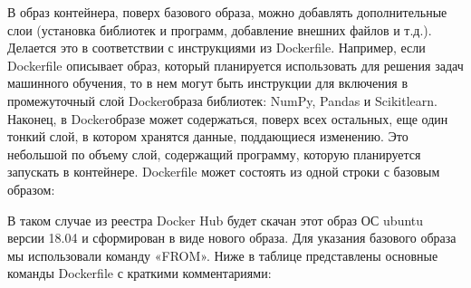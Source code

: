 \documentclass[letterpaper,10pt,russian]{sphinxmanual}
\begin{document}
\sphinxAtStartPar
В образ контейнера, поверх базового образа, можно добавлять дополнительные слои (установка библиотек и программ, добавление внешних файлов и т.д.). Делается это в соответствии с инструкциями из Dockerfile. Например, если Dockerfile описывает образ, который планируется использовать для решения задач машинного обучения, то в нем могут быть инструкции для включения в промежуточный слой Docker\sphinxhyphen{}образа библиотек: NumPy, Pandas и Scikit\sphinxhyphen{}learn. Наконец, в Docker\sphinxhyphen{}образе может содержаться, поверх всех остальных, еще один тонкий слой, в котором хранятся данные, поддающиеся изменению. Это небольшой по объему слой, содержащий программу, которую планируется запускать в контейнере. Dockerfile может состоять из одной строки с базовым образом:

\begin{sphinxVerbatim}[commandchars=\\\{\}]
\end{sphinxVerbatim}

\sphinxAtStartPar
В таком случае из реестра Docker Hub будет скачан этот образ ОС ubuntu версии 18.04 и сформирован в виде нового образа. Для указания базового образа мы использовали команду «FROM». Ниже в таблице представлены основные команды Dockerfile с краткими комментариями:

\sphinxAtStartPar
{}
\end{document}
